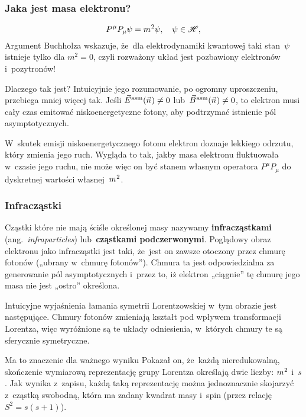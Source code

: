 \documentclass[10pt,t]{beamer}
\begin{document}
\begin{frame}
  \frametitle{Jaka jest masa elektronu?}

  \vspace{-1em}


  \begin{equation}
    \label{eq:Glowne-rodzaje-problemow-podczerwonych-13}
    P^{ \hspace{0.05em} \mu } P_{ \mu } \psi  = m^{ \hspace{0.05em} 2 } \psi, \quad
    \psi \in \mathcal{H},
  \end{equation}
  Argument Buchholza wskazuje, że~dla elektrodynamiki kwantowej taki
  stan~$\psi$ istnieje tylko dla $m^{ 2 } = 0$, czyli rozważony układ jest
  pozbawiony elektronów i~pozytronów!

  Dlaczego tak jest? Intuicyjnie jego rozumowanie, po ogromny uproszczeniu,
  przebiega mniej więcej tak. Jeśli $\vec{E}^{ \hspace{0.05em} \text{asm} }( \vec{n} \hspace{0.05em} ) \neq 0$ lub~$\vec{B}^{ \hspace{0.05em} \text{asm} }( \vec{n} \hspace{0.05em} ) \neq 0$, to
  elektron musi cały czas emitować niskoenergetyczne fotony, aby podtrzymać
  istnienie pól asymptotycznych.


  W~skutek emisji niskoenergetycznego fotonu elektron doznaje lekkiego
  odrzutu, który zmienia jego ruch. Wygląda to tak, jakby masa
  elektronu fluktuowała w~czasie jego ruchu, nie może więc on być stanem
  własnym operatora $P^{ \mu } P_{ \mu }$ do dyskretnej wartości
  własnej~$m^{ \hspace{0.05em} 2 }$.

\end{frame}





\begin{frame}
  \frametitle{Infracząstki}


  Cząstki które nie mają ściśle określonej masy nazywamy
  \textbf{infracząstkami} (ang.~\textit{infraparticles})
  lub~\textbf{cząstkami podczerwonymi}. Poglądowy obraz elektronu jako
  infracząstki jest taki, że~jest on zawsze otoczony przez chmurę fotonów
  („ubrany w~chmurę fotonów”). Chmura ta jest odpowiedzialna za generowanie
  pól asymptotycznych i~przez to, iż elektron „ciągnie” tę chmurę jego masa
  nie jest „ostro” określona.

  Intuicyjne wyjaśnienia łamania symetrii Lorentzowskiej w~tym obrazie
  jest następujące. Chmury fotonów zmieniają kształt pod wpływem
  transformacji Lorentza, więc wyróżnione są te układy odniesienia,
  w~których chmury te są sferycznie symetryczne.

  Ma to znaczenie dla ważnego wyniku
  Pokazał on, że~każdą nieredukowalną, skończenie wymiarową reprezentację
  grupy Lorentza określają dwie liczby: $m^{ \hspace{0.05em} 2 }$ i~$s$. Jak
  wynika z~zapisu, każdą taką reprezentację można jednoznacznie skojarzyć
  z~cząstką swobodną, która ma zadany kwadrat masy i~spin (przez relację
  $S^{ 2 } = s ( s + 1 )$).

\end{frame}
\end{document}
